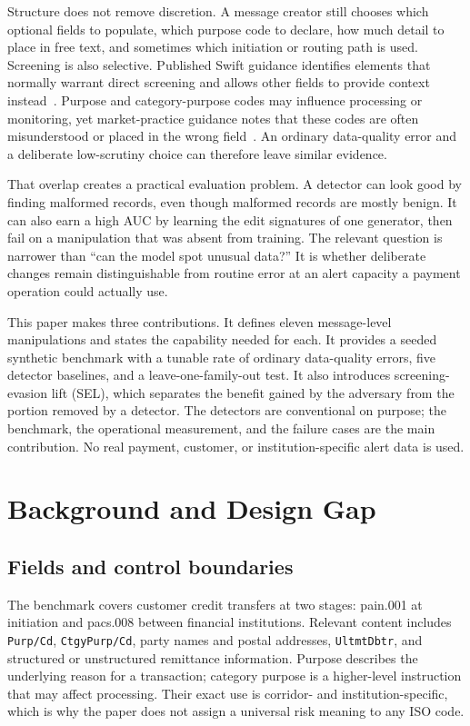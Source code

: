 \documentclass[conference]{IEEEtran}
\begin{document}
Structure does not remove discretion. A message creator still chooses which
optional fields to populate, which purpose code to declare, how much detail to
place in free text, and sometimes which initiation or routing path is used.
Screening is also selective. Published Swift guidance identifies elements that
normally warrant direct screening and allows other fields to provide context
instead~\cite{swiftgp2021}. Purpose and category-purpose codes may influence
processing or monitoring, yet market-practice guidance notes that these codes
are often misunderstood or placed in the wrong field~\cite{pmpg2024}. An
ordinary data-quality error and a deliberate low-scrutiny choice can therefore
leave similar evidence.

That overlap creates a practical evaluation problem. A detector can look good
by finding malformed records, even though malformed records are mostly benign.
It can also earn a high AUC by learning the edit signatures of one generator,
then fail on a manipulation that was absent from training. The relevant
question is narrower than ``can the model spot unusual data?'' It is whether
deliberate changes remain distinguishable from routine error at an alert
capacity a payment operation could actually use.

This paper makes three contributions. It defines eleven message-level
manipulations and states the capability needed for each. It provides a seeded
synthetic benchmark with a tunable rate of ordinary data-quality errors, five
detector baselines, and a leave-one-family-out test. It also introduces
screening-evasion lift (SEL), which separates the benefit gained by the
adversary from the portion removed by a detector. The detectors are
conventional on purpose; the benchmark, the operational measurement, and the
failure cases are the main contribution. No real payment, customer, or
institution-specific alert data is used.

\section{Background and Design Gap}
\subsection{Fields and control boundaries}
The benchmark covers customer credit transfers at two stages: pain.001 at
initiation and pacs.008 between financial institutions. Relevant content
includes \texttt{Purp/Cd}, \texttt{CtgyPurp/Cd}, party names and postal
addresses, \texttt{UltmtDbtr}, and structured or unstructured remittance
information. Purpose describes the underlying reason for a transaction;
category purpose is a higher-level instruction that may affect processing.
Their exact use is corridor- and institution-specific, which is why the paper
does not assign a universal risk meaning to any ISO code.
\end{document}
